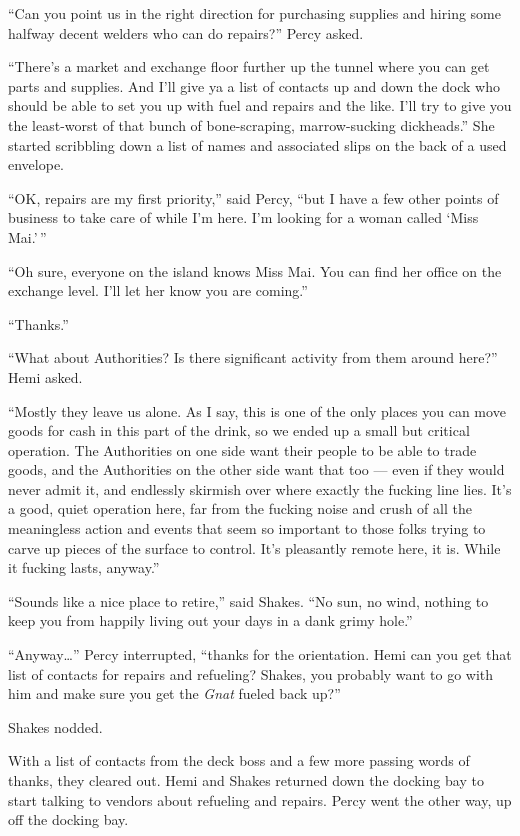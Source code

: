 \documentclass[
]{scrbook}
\begin{document}
``Can you point us in the right direction for purchasing supplies and
hiring some halfway decent welders who can do repairs?'' Percy asked.

``There's a market and exchange floor further up the tunnel where you
can get parts and supplies. And I'll give ya a list of contacts up and
down the dock who should be able to set you up with fuel and repairs and
the like. I'll try to give you the least-worst of that bunch of
bone-scraping, marrow-sucking dickheads.'' She started scribbling down a
list of names and associated slips on the back of a used envelope.

``OK, repairs are my first priority,'' said Percy, ``but I have a few
other points of business to take care of while I'm here. I'm looking for
a woman called `Miss Mai.'\,''

``Oh sure, everyone on the island knows Miss Mai. You can find her
office on the exchange level. I'll let her know you are coming.''

``Thanks.''

``What about Authorities? Is there significant activity from them around
here?'' Hemi asked.

``Mostly they leave us alone. As I say, this is one of the only places
you can move goods for cash in this part of the drink, so we ended up a
small but critical operation. The Authorities on one side want their
people to be able to trade goods, and the Authorities on the other side
want that too --- even if they would never admit it, and endlessly
skirmish over where exactly the fucking line lies. It's a good, quiet
operation here, far from the fucking noise and crush of all the
meaningless action and events that seem so important to those folks
trying to carve up pieces of the surface to control. It's pleasantly
remote here, it is. While it fucking lasts, anyway.''

``Sounds like a nice place to retire,'' said Shakes. ``No sun, no wind,
nothing to keep you from happily living out your days in a dank grimy
hole.''

``Anyway\ldots{}'' Percy interrupted, ``thanks for the orientation. Hemi
can you get that list of contacts for repairs and refueling? Shakes, you
probably want to go with him and make sure you get the \emph{Gnat}
fueled back up?''

Shakes nodded.

With a list of contacts from the deck boss and a few more passing words
of thanks, they cleared out. Hemi and Shakes returned down the docking
bay to start talking to vendors about refueling and repairs. Percy went
the other way, up off the docking bay.
\end{document}
